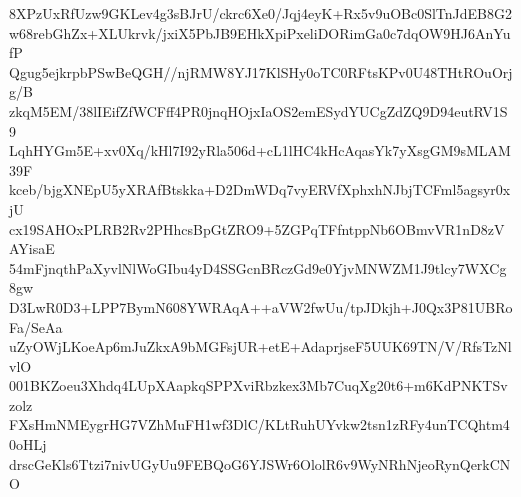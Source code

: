 8XPzUxRfUzw9GKLev4g3sBJrU/ckrc6Xe0/Jqj4eyK+Rx5v9uOBc0SlTnJdEB8G2
w68rebGhZx+XLUkrvk/jxiX5PbJB9EHkXpiPxeliDORimGa0c7dqOW9HJ6AnYufP
Qgug5ejkrpbPSwBeQGH//njRMW8YJ17KlSHy0oTC0RFtsKPv0U48THtROuOrjg/B
zkqM5EM/38lIEifZfWCFff4PR0jnqHOjxIaOS2emESydYUCgZdZQ9D94eutRV1S9
LqhHYGm5E+xv0Xq/kHl7I92yRla506d+cL1lHC4kHcAqasYk7yXsgGM9sMLAM39F
kceb/bjgXNEpU5yXRAfBtskka+D2DmWDq7vyERVfXphxhNJbjTCFml5agsyr0xjU
cx19SAHOxPLRB2Rv2PHhcsBpGtZRO9+5ZGPqTFfntppNb6OBmvVR1nD8zVAYisaE
54mFjnqthPaXyvlNlWoGIbu4yD4SSGcnBRczGd9e0YjvMNWZM1J9tlcy7WXCg8gw
D3LwR0D3+LPP7BymN608YWRAqA++aVW2fwUu/tpJDkjh+J0Qx3P81UBRoFa/SeAa
uZyOWjLKoeAp6mJuZkxA9bMGFsjUR+etE+AdaprjseF5UUK69TN/V/RfsTzNlvlO
001BKZoeu3Xhdq4LUpXAapkqSPPXviRbzkex3Mb7CuqXg20t6+m6KdPNKTSvzolz
FXsHmNMEygrHG7VZhMuFH1wf3DlC/KLtRuhUYvkw2tsn1zRFy4unTCQhtm40oHLj
drscGeKls6Ttzi7nivUGyUu9FEBQoG6YJSWr6OlolR6v9WyNRhNjeoRynQerkCNO
